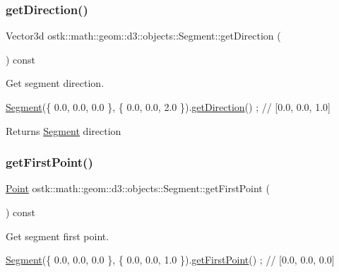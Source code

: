 \subsubsection{\texorpdfstring{get\+Direction()}{getDirection()}}
{\footnotesize\ttfamily Vector3d ostk\+::math\+::geom\+::d3\+::objects\+::\+Segment\+::get\+Direction (\begin{DoxyParamCaption}{ }\end{DoxyParamCaption}) const}



Get segment direction. 


\begin{DoxyCode}
\hyperlink{classostk_1_1math_1_1geom_1_1d3_1_1objects_1_1_segment_aa2cb60ce06335a5f76120c658219494c}{Segment}(\{ 0.0, 0.0, 0.0 \}, \{ 0.0, 0.0, 2.0 \}).\hyperlink{classostk_1_1math_1_1geom_1_1d3_1_1objects_1_1_segment_ab708b9d0ab53ef8b15974244810a732f}{getDirection}() ; \textcolor{comment}{// [0.0, 0.0, 1.0]}
\end{DoxyCode}


\begin{DoxyReturn}{Returns}
\hyperlink{classostk_1_1math_1_1geom_1_1d3_1_1objects_1_1_segment}{Segment} direction 
\end{DoxyReturn}
\mbox{\label{classostk_1_1math_1_1geom_1_1d3_1_1objects_1_1_segment_a0dd0944d8a53bc07b241fc933a2b023f}} 
\subsubsection{\texorpdfstring{get\+First\+Point()}{getFirstPoint()}}
{\footnotesize\ttfamily \hyperlink{classostk_1_1math_1_1geom_1_1d3_1_1objects_1_1_point}{Point} ostk\+::math\+::geom\+::d3\+::objects\+::\+Segment\+::get\+First\+Point (\begin{DoxyParamCaption}{ }\end{DoxyParamCaption}) const}



Get segment first point. 


\begin{DoxyCode}
\hyperlink{classostk_1_1math_1_1geom_1_1d3_1_1objects_1_1_segment_aa2cb60ce06335a5f76120c658219494c}{Segment}(\{ 0.0, 0.0, 0.0 \}, \{ 0.0, 0.0, 1.0 \}).\hyperlink{classostk_1_1math_1_1geom_1_1d3_1_1objects_1_1_segment_a0dd0944d8a53bc07b241fc933a2b023f}{getFirstPoint}() ; \textcolor{comment}{// [0.0, 0.0, 0.0]}
\end{DoxyCode}


